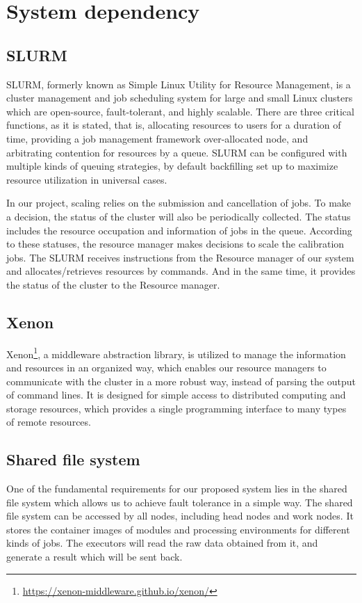 \section{System dependency}
\subsection{SLURM}
SLURM, formerly known as Simple Linux Utility for Resource Management, is a cluster management and job scheduling system for large and small Linux clusters which are
open-source, fault-tolerant, and highly scalable. There are three critical functions, as it
is stated, that is, allocating resources to users for a duration of time, providing a job
management framework over-allocated node, and arbitrating contention for resources by
a queue. SLURM can be configured with multiple kinds of queuing strategies, by default
backfilling set up to maximize resource utilization in universal cases.

In our project, scaling relies on the submission and cancellation of jobs. To
make a decision, the status of the cluster will also be periodically collected. The status
includes the resource occupation and information of jobs in the queue. According to
these statuses, the resource manager makes decisions to scale the calibration jobs. The
SLURM receives instructions from the Resource manager of our system and allocates/retrieves
resources by commands. And in the same time, it provides the status of the cluster to the
Resource manager.

\subsection{Xenon}
Xenon\footnote{\url{https://xenon-middleware.github.io/xenon/}}, a middleware abstraction library, is utilized to manage the information and resources in an organized way, which enables our resource managers to communicate with the cluster in a more robust way, instead of parsing the output of command lines. 
It is designed for simple access to distributed computing and storage resources, which provides a single programming interface to many types of remote resources. 
\subsection{Shared file system}
One of the fundamental requirements for our proposed system lies in the shared file system which
allows us to achieve fault tolerance in a simple way. The shared file system can be accessed
by all nodes, including head nodes and work nodes. It stores the container images of modules
and processing environments for different kinds of jobs. The executors will read the raw
data obtained from it, and generate a result which will be sent back.

